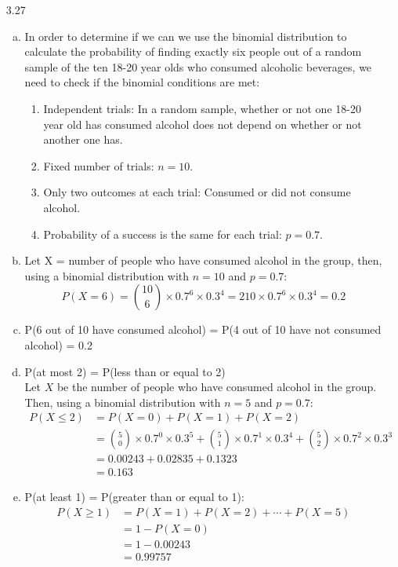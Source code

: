 \documentclass[11pt]{article}
\newenvironment{parts}{
\vspace{-0.25cm}
\begin{enumerate}[(a)]
\setlength{\itemsep}{0mm}
}
{\end{enumerate}
}
\newenvironment{cond}{
\begin{enumerate}[1.]
\setlength{\itemsep}{0mm}
}
{\end{enumerate}
}
\begin{document}
\begin{enumerate}
\item[3.27]
\begin{parts}
\item In order to determine if we can we use the binomial distribution to calculate the probability of finding exactly six people out of a random sample of the ten 18-20 year olds who consumed alcoholic beverages, we need to check if the binomial conditions are met:
\begin{cond}
\item Independent trials: In a random sample, whether or not one 18-20 year old has consumed alcohol does not depend on whether or not another one has.
\item Fixed number of trials: $n = 10$.
\item Only two outcomes at each trial: Consumed or did not consume alcohol.
\item Probability of a success is the same for each trial: $p = 0.7$.
\end{cond}

\item Let X = number of people who have consumed alcohol in the group, then, using a binomial distribution with $n = 10$ and $p = 0.7$:
\[ P(X = 6) = {10 \choose 6} \times 0.7^6 \times 0.3^4 = 210 \times 0.7^6 \times 0.3^4 = 0.2 \]

\item P(6 out of 10 have consumed alcohol) = P(4 out of 10 have not consumed alcohol) = 0.2

\item P(at most 2) = P(less than or equal to 2) \\
Let $X$ be the number of people who have consumed alcohol in the group. Then, using a binomial distribution with $n = 5$ and $p = 0.7$: 
\begin{align*}
P(X \le 2) &= P(X = 0) + P(X = 1) + P(X = 2) \\
&= {5 \choose 0} \times 0.7^0 \times 0.3^5 + {5 \choose 1} \times 0.7^1 \times 0.3^4 + {5 \choose 2} \times 0.7^2 \times 0.3^3 \\
&= 0.00243 + 0.02835 + 0.1323  \\
&= 0.163
\end{align*}

\item P(at least 1) = P(greater than or equal to 1): 
\begin{align*}
P(X \ge 1) &= P(X = 1) + P(X = 2) + \cdots + P(X = 5) \\
&= 1 - P(X = 0) \\
&= 1 - 0.00243 \\
&= 0.99757
\end{align*}


\end{parts}
\end{enumerate}
\end{document}
